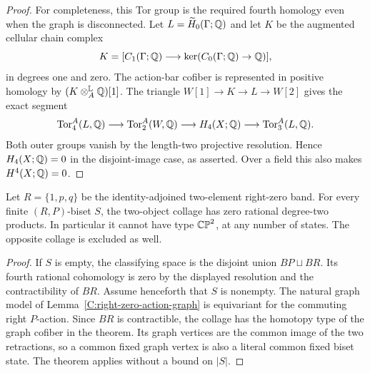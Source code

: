 \begin{proof}
For completeness, this Tor group is the required fourth
homology even when the graph is disconnected.  Let
$L=\widetilde H_0(\Gamma;\mathbb Q)$ and let $K$ be the augmented
cellular chain complex
\[
 K=[C_1(\Gamma;\mathbb Q)\longrightarrow
       \ker(C_0(\Gamma;\mathbb Q)\to\mathbb Q)],
\]
in degrees one and zero.  The action-bar cofiber is represented
in positive homology by $(K\otimes_A^{\mathbb L}\mathbb Q)[1]$.
The triangle
$W[1]\to K\to L\to W[2]$ gives the exact segment
\[
 \operatorname{Tor}_4^A(L,\mathbb Q)\longrightarrow
 \operatorname{Tor}_2^A(W,\mathbb Q)\longrightarrow
 H_4(X;\mathbb Q)\longrightarrow
 \operatorname{Tor}_3^A(L,\mathbb Q).
\]
Both outer groups vanish by the length-two projective
resolution.  Hence $H_4(X;\mathbb Q)=0$ in the disjoint-image case,
as asserted.  Over a field this also makes $H^4(X;\mathbb Q)=0$.
\end{proof}

\begin{corollary}
\label{C:P5-right-zero-three-all-states}
Let $R=\{1,p,q\}$ be the identity-adjoined two-element right-zero
band.  For every finite $(R,P)$-biset $S$, the two-object collage
has zero rational degree-two products.  In particular it cannot
have type $\mathbb {CP}^2$, at any number of states.  The opposite
collage is excluded as well.
\end{corollary}
\begin{proof}
If $S$ is empty, the classifying space is the disjoint union
$BP\sqcup BR$.  Its fourth rational cohomology is zero by
the displayed resolution and the contractibility of $BR$.
Assume henceforth that $S$ is nonempty.
The natural graph model of Lemma~\ref{C:right-zero-action-graph}
is equivariant for the commuting right $P$-action.
Since $BR$ is contractible, the collage has the homotopy type
of the graph cofiber in the theorem.  Its graph vertices are
the common image of the two retractions, so a common fixed
graph vertex is also a literal common fixed biset state.
The theorem applies without a bound on $|S|$.
\end{proof}
